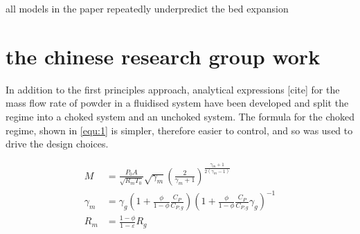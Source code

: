 all models in the paper repeatedly underpredict the bed expansion
\section{the chinese research group work}

In addition to the first principles approach, analytical expressions [cite] for the mass flow rate of powder in a fluidised system have been developed and split the regime into a choked system and an unchoked system. The formula for the choked regime, shown in \autoref{equ:1} is simpler, therefore easier to control, and so was used to drive the design choices.

\begin{align}
    M &= \frac{P_0 A}{\sqrt{R_m T_0}} \sqrt{\gamma_m} {\left( \frac{2}{\gamma_m + 1} \right)}^{\frac{\gamma_m + 1}{2(\gamma_m - 1)}} \\[10pt]
    \gamma_m &= \gamma_g \left( 1 + \frac{\phi}{1 - \phi} \frac{C_P}{C_{P,g}} \right) {\left( 1 + \frac{\phi}{1 - \phi} \frac{C_P}{C_{P,g}} \gamma_g \right)}^{-1} \\[10pt]
    R_m &= \frac{1 - \phi}{1 - \varepsilon} R_g
\end{align}\label{equ:1}
    